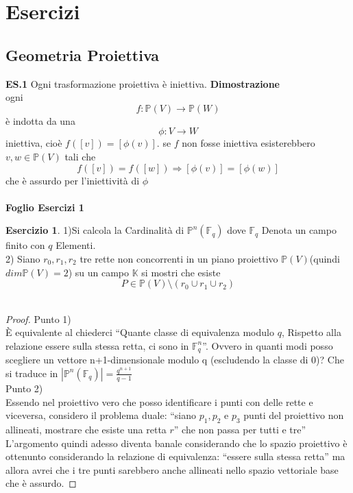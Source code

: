 \documentclass[a4paper,twoside]{article}
\newcommand{\Pro}{\mathbb{P}}
\newcommand{\K}{\mathbb{K}}
\newcommand{\F}{\mathbb{F}}
\newcommand{\nline}{$\phantom{}$\\}
\theoremstyle{definition}
\newtheorem{ex}[theorem]{Esercizio}
\numberwithin{theorem}{section}
\begin{document}
\newpage
\section{Esercizi}
\subsection{Geometria Proiettiva}
\textbf{ES.1} Ogni trasformazione proiettiva è iniettiva.
\textbf{Dimostrazione}\\
ogni $$f:\Pro(V)\to\Pro(W)$$ è indotta da una $$\phi:V\to W$$
iniettiva, cioè $f([v])=[\phi(v)]$. se $f$ non fosse iniettiva esisterebbero $v,w\in\Pro(V)$ tali che $$f([v])=f([w])\Rightarrow [\phi(v)]=[\phi(w)]$$ che è assurdo per l'iniettività di $\phi$ \nline
\\

\centering \textbf{Foglio Esercizi 1}
\begin{ex}
    1)Si calcola la Cardinalità di $\Pro^n(\F_q)$ dove $\F_q$ Denota un campo finito con $q$ Elementi. \\
    
    2) Siano $r_0, r_1,r_2$ tre rette non concorrenti in un piano proiettivo $\Pro(V)$(quindi $dim\Pro(V)=2$) su un campo $\K$ si mostri che esiste $$P\in \Pro(V)\setminus (r_0\cup r_1\cup r_2)$$ \\
\end{ex}
\begin{proof}
    
Punto 1) \\
È equivalente al chiederci “Quante classe di equivalenza modulo $q$, Rispetto alla relazione essere sulla stessa retta, ci sono in $\F_q^n$”. Ovvero in quanti modi posso scegliere un vettore n+1-dimensionale modulo q (escludendo la classe di 0)?
Che si traduce in $|\Pro^n(\F_q)|=\frac{q^{n+1}}{q-1}$\\

Punto 2)\\
Essendo nel proiettivo vero che posso identificare i punti con delle rette e viceversa, considero il problema duale: “siano $p_1,p_2$ e $p_3$ punti del proiettivo non allineati, mostrare che esiste una retta $r$” che non passa per tutti e tre”
L’argomento quindi adesso diventa banale considerando che lo spazio proiettivo è ottenunto considerando la relazione di equivalenza: “essere sulla stessa retta” ma allora avrei che i tre punti sarebbero anche allineati nello spazio vettoriale base che è assurdo.

\end{proof}
\end{document}
